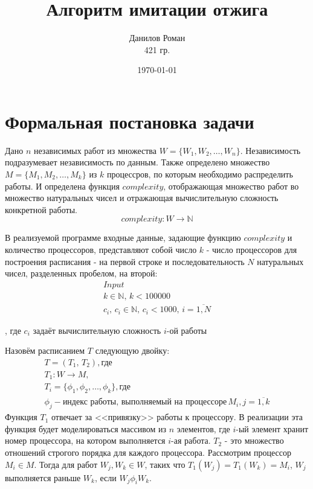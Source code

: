 \documentclass[a4paper,12pt]{article}
\author{Данилов Роман \\ 421 гр.}
\title{Алгоритм имитации отжига}
\date{\today}
\begin{document}
\maketitle

\section{Формальная постановка задачи}

Дано $n$ независимых работ из множества $W = \{W_1, W_2, \dots, W_n\}$.
Независимость подразумевает независимость по данным.
Также определено множество $M = \{M_1, M_2, \dots, M_k\}$ из $k$ процессров, по которым
необходимо распределить работы.
И определена функция $complexity$, отображающая множество работ во множество
натуральных чисел и отражающая вычислительную сложность конкретной работы.
\[complexity: W \rightarrow \mathbb{N}\]

В реализуемой программе входные данные, задающие функцию $complexity$ и количество процессоров,
представляют собой число $k$ - число процессоров для построения расписания - на первой строке
и последовательность $N$ натуральных чисел, разделенных пробелом,
на второй:
\begin{gather*}
    Input \\ 
    k \in \mathbb{N}, \, k < 100000 \\
    c_i, \, c_i \in \mathbb{N}, \, c_i < 1000, \, i = \overline{1, N}
\end{gather*}

\noindent, где $c_i$ задаёт вычислительную сложность $i$-ой работы

\vspace{5pt}
Назовём расписанием $T$ следующую двойку:
\begin{gather*}
    T = (T_1, \, T_2), \text{где} \\
    T_1 : W \rightarrow M, \\
    T_i = \{\phi_1, \phi_2, \dots, \phi_k\}, \text{где}\\
    \phi_j - \text{индекс работы, выполняемый на процессоре} \, M_i, j = \overline{1, k}
\end{gather*}
Функция $T_1$ отвечает за <<привязку>> работы к процессору. В реализации
эта функция будет моделироваться массивом из $n$ элементов, где $i$-ый элемент
хранит номер процессора, на котором выполняется $i$-ая работа. $T_2$ - это
множество отношений строгого порядка для каждого процессора. Рассмотрим процессор
$M_i \in M$. Тогда для работ $W_j, W_k \in W$, таких что $T_1(W_j) = T_1(W_k) = M_i$,
$W_j$ выполняется раньше $W_k$, если $W_j \phi_i W_k$.
\end{document}
